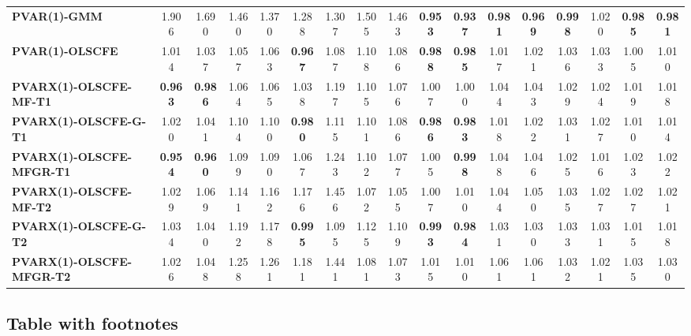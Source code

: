 \documentclass[Theme1]{{template_material/eurostat}}
\begin{document}
\begin{landscape}
\begin{table}[h]
{\begin{tabular}{l|cc|cc|cc|cc|cc|cc|cc|cc}
\hline
\textbf{PVAR(1)-GMM} & 1.906 & 1.690 & 1.460 & 1.370 & 1.288 & 1.307 & 1.505 & 1.463 & \textbf{0.953} & \textbf{0.937} & \textbf{0.981} & \textbf{0.969} & \textbf{0.998} & 1.020 & \textbf{0.985} & \textbf{0.981} \\
\textbf{PVAR(1)-OLSCFE} & 1.014 & 1.037 & 1.057 & 1.063 & \textbf{0.967} & 1.087 & 1.108 & 1.086 & \textbf{0.988} & \textbf{0.985} & 1.017 & 1.021 & 1.036 & 1.033 & 1.005 & 1.010 \\
\textbf{PVARX(1)-OLSCFE-MF-T1} & \textbf{0.963} & \textbf{0.986} & 1.064 & 1.065 & 1.038 & 1.197 & 1.105 & 1.076 & 1.007 & 1.000 & 1.044 & 1.043 & 1.029 & 1.024 & 1.019 & 1.018 \\
\textbf{PVARX(1)-OLSCFE-G-T1} & 1.020 & 1.041 & 1.104 & 1.100 & \textbf{0.980} & 1.115 & 1.101 & 1.086 & \textbf{0.986} & \textbf{0.983} & 1.018 & 1.022 & 1.031 & 1.027 & 1.010 & 1.014 \\
\textbf{PVARX(1)-OLSCFE-MFGR-T1} & \textbf{0.954} & \textbf{0.960} & 1.099 & 1.090 & 1.067 & 1.243 & 1.102 & 1.077 & 1.005 & \textbf{0.998} & 1.048 & 1.046 & 1.025 & 1.016 & 1.023 & 1.022 \\
\textbf{PVARX(1)-OLSCFE-MF-T2} & 1.029 & 1.069 & 1.141 & 1.162 & 1.176 & 1.456 & 1.072 & 1.055 & 1.007 & 1.010 & 1.044 & 1.050 & 1.035 & 1.027 & 1.027 & 1.021 \\
\textbf{PVARX(1)-OLSCFE-G-T2} & 1.034 & 1.040 & 1.192 & 1.178 & \textbf{0.995} & 1.095 & 1.125 & 1.109 & \textbf{0.993} & \textbf{0.984} & 1.031 & 1.030 & 1.033 & 1.031 & 1.015 & 1.018 \\
\textbf{PVARX(1)-OLSCFE-MFGR-T2} & 1.026 & 1.048 & 1.258 & 1.261 & 1.181 & 1.441 & 1.081 & 1.073 & 1.015 & 1.010 & 1.061 & 1.061 & 1.032 & 1.021 & 1.035 & 1.030 \\
\hline
 
\end{tabular}
}

\end{table}


\end{landscape}







\restoregeometry
\pagestyle{numstyle}


\subsection{Table with footnotes}
\end{document}

